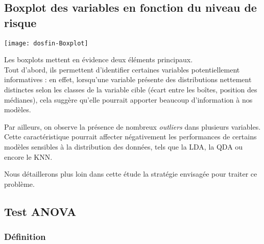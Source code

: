 \documentclass[a4paper,11pt]{article}
\begin{document}
\subsection{Boxplot des variables en fonction du niveau de risque}

\begin{center}
\texttt{[image: dosfin-Boxplot]}

\end{center}

Les boxplots mettent en évidence deux éléments principaux.\\
Tout d’abord, ils permettent d’identifier certaines variables potentiellement informatives : en effet, lorsqu’une variable présente des distributions nettement distinctes selon les classes de la variable cible (écart entre les boîtes, position des médianes), cela suggère qu’elle pourrait apporter beaucoup d'information à nos modèles.

\vspace{1em}

Par ailleurs, on observe la présence de nombreux \textit{outliers} dans plusieurs variables. Cette caractéristique pourrait affecter négativement les performances de certains modèles sensibles à la distribution des données, tels que la LDA, la QDA ou encore le KNN.

\vspace{1em}

Nous détaillerons plus loin dans cette étude la stratégie envisagée pour traiter ce problème.

\newpage

\subsection{Test ANOVA}

\subsubsection{Définition}
\end{document}
